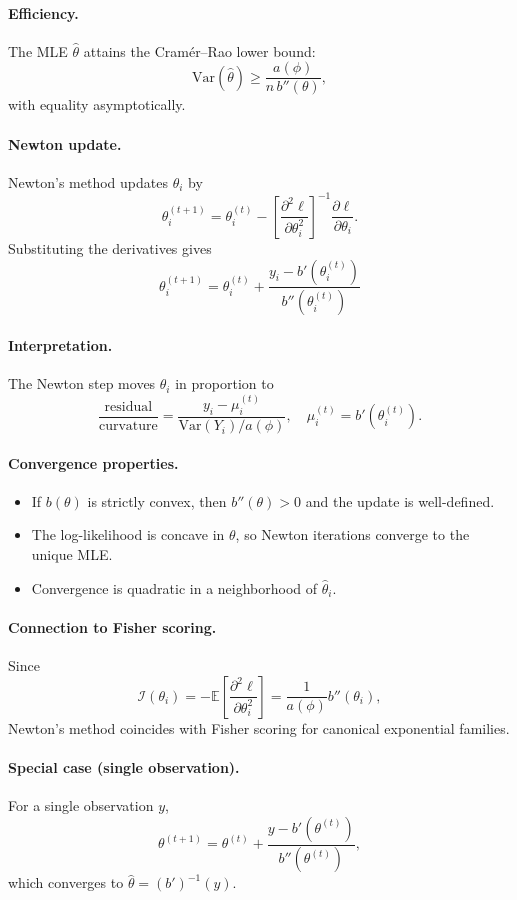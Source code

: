 \documentclass[11pt]{article}
\theoremstyle{definition}
\begin{document}
\paragraph{Efficiency.}
The MLE $\hat\theta$ attains the Cram\'er--Rao lower bound:
\[
\mathrm{Var}(\hat\theta) \ge \frac{a(\phi)}{n\,b''(\theta)},
\]
with equality asymptotically.

\paragraph{Newton update.}
Newton's method updates $\theta_i$ by
\[
\theta_i^{(t+1)}
=
\theta_i^{(t)}
-
\left[
\frac{\partial^2 \ell}{\partial \theta_i^2}
\right]^{-1}
\frac{\partial \ell}{\partial \theta_i}.
\]
Substituting the derivatives gives
\[
\boxed{
\theta_i^{(t+1)}
=
\theta_i^{(t)}
+
\frac{y_i - b'(\theta_i^{(t)})}{b''(\theta_i^{(t)})}
}
\]

\paragraph{Interpretation.}
The Newton step moves $\theta_i$ in proportion to
\[
\frac{\text{residual}}{\text{curvature}}
=
\frac{y_i - \mu_i^{(t)}}{\mathrm{Var}(Y_i)/a(\phi)},
\quad
\mu_i^{(t)} = b'(\theta_i^{(t)}).
\]

\paragraph{Convergence properties.}
\begin{itemize}
  \item If $b(\theta)$ is strictly convex, then $b''(\theta)>0$ and the update is well-defined.
  \item The log-likelihood is concave in $\theta$, so Newton iterations converge to the unique MLE.
  \item Convergence is quadratic in a neighborhood of $\hat\theta_i$.
\end{itemize}

\paragraph{Connection to Fisher scoring.}
Since
\[
\mathcal{I}(\theta_i)
=
-\mathbb{E}\!\left[
\frac{\partial^2 \ell}{\partial \theta_i^2}
\right]
=
\frac{1}{a(\phi)} b''(\theta_i),
\]
Newton's method coincides with Fisher scoring for canonical exponential families.

\paragraph{Special case (single observation).}
For a single observation $y$,
\[
\theta^{(t+1)}
=
\theta^{(t)}
+
\frac{y - b'(\theta^{(t)})}{b''(\theta^{(t)})},
\]
which converges to $\hat\theta = (b')^{-1}(y)$.
\end{document}
